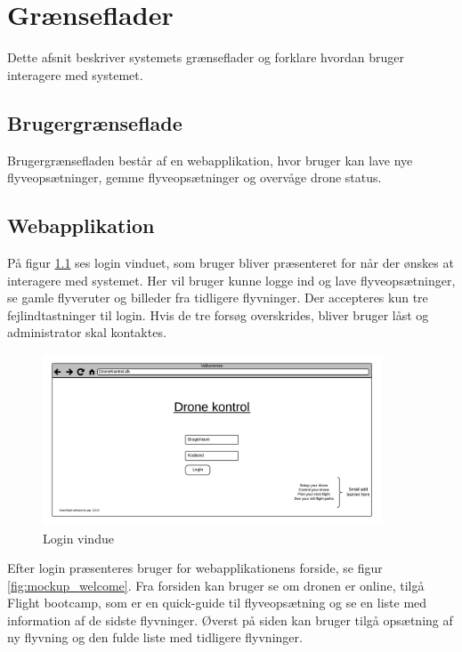 \chapter{Grænseflader}
Dette afsnit beskriver systemets grænseflader og forklare hvordan bruger interagere med systemet.

\section{Brugergrænseflade}
Brugergrænsefladen består af en webapplikation, hvor bruger kan lave nye flyveopsætninger, gemme flyveopsætninger og overvåge drone status. 

\section{Webapplikation}
På figur \ref{fig:mockup_login} ses login vinduet, som bruger bliver præsenteret for når der ønskes at interagere med systemet. Her vil bruger kunne logge ind og lave flyveopsætninger, se gamle flyveruter og billeder fra tidligere flyvninger. Der accepteres kun tre fejlindtastninger til login. Hvis de tre forsøg overskrides, bliver bruger låst og administrator skal kontaktes.

\vspace{-5pt}
\begin{figure}[H]
	\centering
	\includegraphics[width=0.9\textwidth]{Billeder/UI_mockups/login.png}
	\vspace{-.5cm}
	\caption{Login vindue}
	\label{fig:mockup_login}
\end{figure}

 \newpage

Efter login præsenteres bruger for webapplikationens forside, se figur \ref{fig:mockup_welcome}. 
Fra forsiden kan bruger se om dronen er online, tilgå Flight bootcamp, som er en quick-guide til flyveopsætning og se en liste med information af de sidste flyvninger. Øverst på siden kan bruger tilgå opsætning af ny flyvning og den fulde liste med tidligere flyvninger.

